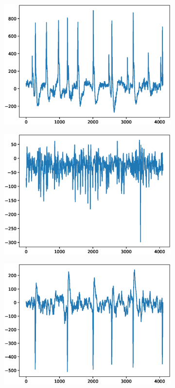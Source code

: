 \documentclass[12pt]{article}
\begin{document}
\begin{figure}
\begin{subfigure}{.25\textwidth}
  \centering
  \includegraphics[width=.8\linewidth]{figures/signals/D/F002.eps}
\end{subfigure}%
\begin{subfigure}{.25\textwidth}
  \centering
  \includegraphics[width=.8\linewidth]{figures/signals/D/F019.eps}
\end{subfigure}
\begin{subfigure}{.25\textwidth}
  \centering
  \includegraphics[width=.8\linewidth]{figures/signals/D/F041.eps}

\end{subfigure}
\end{figure}
\end{document}
